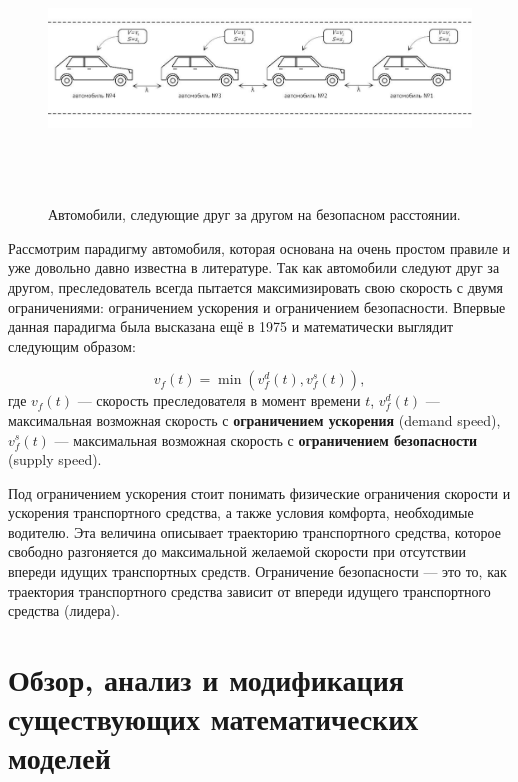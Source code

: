 \documentclass[12pt, a4paper]{extarticle}
\numberwithin{equation}{section}
\numberwithin{figure}{section}
\begin{document}
\begin{figure}[h!]  
	\begin{center}
		\includegraphics[keepaspectratio,width=160mm,height=70mm]{Images/car_following.pdf}
	\end{center}
	\caption{Автомобили, следующие друг за другом на безопасном расстоянии.}
	\label{car_following}
\end{figure}

Рассмотрим парадигму автомобиля, которая основана на очень простом правиле и уже довольно давно известна в литературе. Так как автомобили следуют друг за другом, преследователь всегда пытается максимизировать свою скорость с двумя ограничениями: ограничением ускорения и ограничением безопасности. Впервые данная парадигма была высказана ещё в 1975 \cite{GippsModel} и математически выглядит следующим образом:

\begin{equation*} \label{following_paradigm}
v_f(t) = \min(v_f^d(t), v_f^s(t)),
\end{equation*}
где $v_f(t)$ --- скорость преследователя в момент времени $t$, $v_f^d(t)$ --- максимальная возможная скорость с \textbf{ограничением ускорения} (demand speed), $v_f^s(t)$ --- максимальная возможная скорость с \textbf{ограничением безопасности} (supply speed).

Под ограничением ускорения стоит понимать физические ограничения скорости и ускорения транспортного средства, а также условия комфорта, необходимые водителю. Эта величина описывает траекторию транспортного средства, которое свободно разгоняется до максимальной желаемой скорости при отсутствии впереди идущих транспортных средств. Ограничение безопасности --- это то, как траектория транспортного средства зависит от впереди идущего транспортного средства (лидера).

\section{Обзор, анализ и модификация существующих математических моделей}
\end{document}
